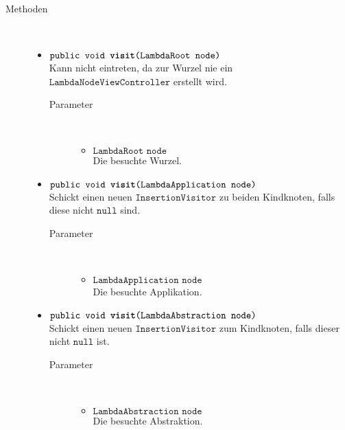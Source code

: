 \begin{description}
\item[Methoden] \hfill \\
	\vspace{-.8cm}
	\begin{itemize}
		\item $\texttt{public void \textbf{visit}(LambdaRoot node)}$ \\ Kann nicht eintreten, da zur Wurzel nie ein $\texttt{LambdaNodeViewController}$ erstellt wird.
		\begin{description}
			\item[Parameter] \hfill \\
			\vspace{-.8cm}
			\begin{itemize}
				\item $\texttt{LambdaRoot node}$ \\ Die besuchte Wurzel.
			\end{itemize}
		\end{description}
				
		\item $\texttt{public void \textbf{visit}(LambdaApplication node)}$ \\ Schickt einen neuen $\texttt{InsertionVisitor}$ zu beiden Kindknoten, falls diese nicht $\texttt{null}$ sind.
		\begin{description}
			\item[Parameter] \hfill \\
			\vspace{-.8cm}
			\begin{itemize}
				\item $\texttt{LambdaApplication node}$ \\ Die besuchte Applikation.
			\end{itemize}
		\end{description}
		
		\item $\texttt{public void \textbf{visit}(LambdaAbstraction node)}$ \\ Schickt einen neuen $\texttt{InsertionVisitor}$ zum Kindknoten, falls dieser nicht $\texttt{null}$ ist.
		\begin{description}
			\item[Parameter] \hfill \\
			\vspace{-.8cm}
			\begin{itemize}
				\item $\texttt{LambdaAbstraction node}$ \\ Die besuchte Abstraktion.
			\end{itemize}
		\end{description}
		

\end{itemize}
\end{description}
